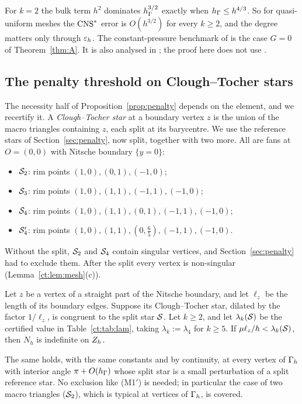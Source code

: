 \begin{remark}
For $k=2$ the bulk term $h^2$ dominates $h_\Gamma^{3/2}$ exactly when $h_\Gamma\le h^{4/3}$. So for quasi-uniform meshes the $\mathrm{CNS}^\ast$ error is $O(h^{3/2})$ for every $k\ge2$, and the degree matters only through $\varepsilon_h$. The constant-pressure benchmark of \cite{GjerdeScott2024} is the case $G=0$ of Theorem~\ref{thm:A}. %
It is also analysed in \cite{Cavalcante}; the proof here does not use \cite{Cavalcante}.
\end{remark}

\subsection{The penalty threshold on Clough--Tocher stars}

The necessity half of Proposition~\ref{prop:penalty} depends on the element, and we recertify it. A \emph{Clough--Tocher star} at a boundary vertex $z$ is the union of the macro triangles containing $z$, each split at its barycentre. We use the reference stars of Section~\ref{sec:penalty}, now split, together with two more. All are fans at $O=(0,0)$ with Nitsche boundary $\{y=0\}$:
\begin{itemize}
\item $\mathcal S_2$: rim points $(1,0),(0,1),(-1,0)$;
\item $\mathcal S_3$: rim points $(1,0),(1,1),(-1,1),(-1,0)$;
\item $\mathcal S_4$: rim points $(1,0),(1,1),(0,1),(-1,1),(-1,0)$;
\item $\mathcal S_4'$: rim points $(1,0),(1,1),(0,\tfrac65),(-1,1),(-1,0)$.
\end{itemize}
Without the split, $\mathcal S_2$ and $\mathcal S_4$ contain singular vertices, and Section~\ref{sec:penalty} had to exclude them. After the split every vertex is non-singular (Lemma~\ref{ct:lem:mesh}(c)).

\begin{proposition}\label{ct:prop:penalty}
Let $z$ be a vertex of a straight part of the Nitsche boundary, and let $\ell_z$ be the length of its boundary edges. Suppose its Clough--Tocher star, dilated by the factor $1/\ell_z$, is congruent to the split star $\mathcal S$. Let $k\ge2$, and let $\lambda_k(\mathcal S)$ be the certified value in Table~\ref{ct:tab:lam}, taking $\lambda_k:=\lambda_4$ for $k\ge5$. If $\mu\ell_z/h<\lambda_k(\mathcal S)$, then $N_h$ is indefinite on $Z_h$.

The same holds, with the same constants and by continuity, at every vertex of $\Gamma_h$ with interior angle $\pi+O(h_\Gamma)$ whose split star is a small perturbation of a split reference star. No exclusion like (M1$'$) is needed; in particular the case of two macro triangles ($\mathcal S_2$), which is typical at vertices of $\Gamma_h$, is covered.
\end{proposition}

